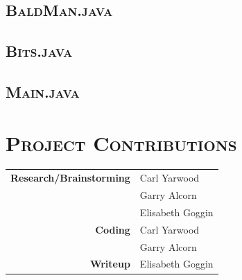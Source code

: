 \documentclass[12pt]{article}
\begin{document}
	\subsection[BaldMan]{\hspace*{1em}\large{}\selectfont\scshape BaldMan.java}
	
	
	\subsection[Bits]{\hspace*{1em}\large{}\selectfont\scshape Bits.java}
	
	
	\subsection[Main]{\hspace*{1em}\large{}\selectfont\scshape Main.java}
	
	
	\section[Project Contributions]{\Large{}\selectfont\scshape Project Contributions}
	
	\begin{center}
		{\scshape\small
		\begin{tabular}{r l}
			\bfseries Research/Brainstorming & Carl Yarwood\\
			& Garry Alcorn\\
			& Elisabeth Goggin\\
			\bfseries Coding & Carl Yarwood\\
			& Garry Alcorn\\
			\bfseries Writeup & Elisabeth Goggin\\
		\end{tabular}
		}
	\end{center}
	
\end{document}
